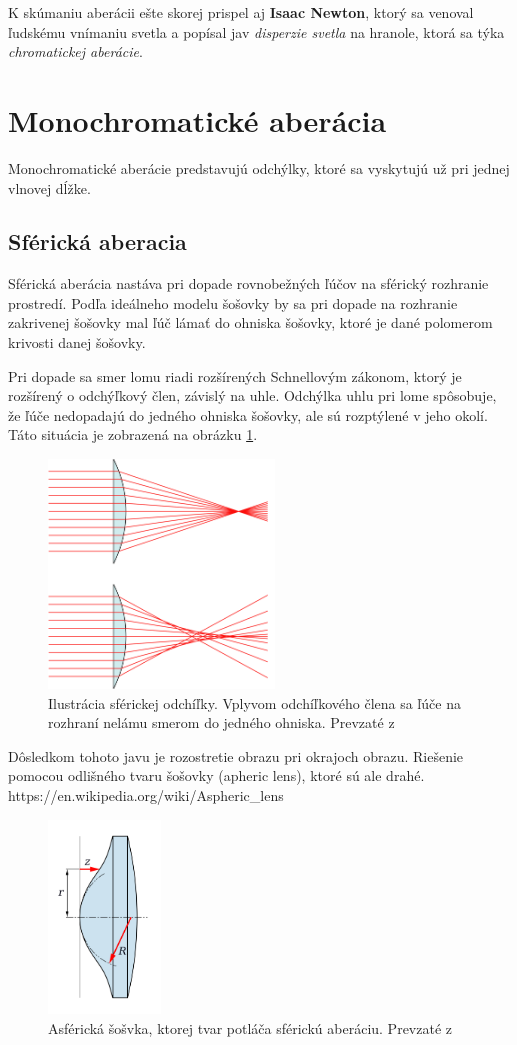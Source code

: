 K skúmaniu aberácii ešte skorej prispel aj \textbf{Isaac Newton}, ktorý sa venoval ľudskému vnímaniu svetla a
popísal jav \textit{disperzie svetla} na hranole, ktorá sa týka \textit{chromatickej aberácie}. \cite{elert}

\section{Monochromatické aberácia}
Monochromatické aberácie predstavujú odchýlky, ktoré sa vyskytujú už pri jednej vlnovej dĺžke.
\subsection{Sférická aberacia}
Sférická aberácia nastáva pri dopade rovnobežných ľúčov na sférický rozhranie prostredí. 
Podľa ideálneho modelu šošovky by sa pri dopade na rozhranie zakrivenej šošovky mal ľúč lámať do ohniska šošovky, ktoré
je dané polomerom krivosti danej šošovky. 

Pri dopade sa smer lomu riadi rozšírených Schnellovým zákonom, ktorý je rozšírený o odchýľkový člen, závislý na
uhle. Odchýlka uhlu pri lome spôsobuje, že ľúče nedopadajú do jedného ohniska šošovky, ale sú
rozptýlené v jeho okolí. Táto situácia
je zobrazená na obrázku \ref{saill}.

\begin{figure}[h]
\centering
\label{saill}
\includegraphics[width=6cm]{obrazky-figures/sphericalAberrationWikipedia.png}
\caption{Ilustrácia sférickej odchíľky. Vplyvom odchíľkového člena sa ľúče na rozhraní nelámu smerom
    do jedného ohniska. Prevzaté z }
\end{figure}

Dôsledkom tohoto javu je rozostretie obrazu pri okrajoch obrazu.  
Riešenie pomocou odlišného tvaru šošovky (apheric lens), ktoré sú ale drahé. https://en.wikipedia.org/wiki/Aspheric\_lens

\begin{figure}[h]
\centering
\includegraphics[width=3cm]{obrazky-figures/asphericLen.png}
\caption{Asférická šošvka, ktorej tvar potláča sférickú aberáciu. Prevzaté z }
\end{figure}

